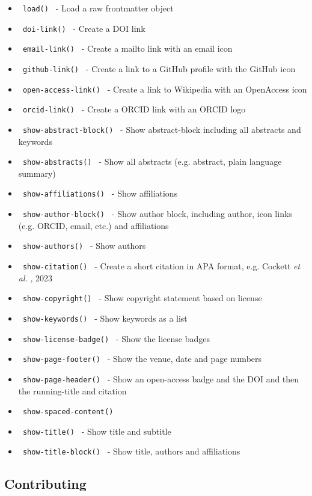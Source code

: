 \begin{itemize}
\tightlist
\item
  \texttt{\ load()\ } - Load a raw frontmatter object
\item
  \texttt{\ doi-link()\ } - Create a DOI link
\item
  \texttt{\ email-link()\ } - Create a mailto link with an email icon
\item
  \texttt{\ github-link()\ } - Create a link to a GitHub profile with
  the GitHub icon
\item
  \texttt{\ open-access-link()\ } - Create a link to Wikipedia with an
  OpenAccess icon
\item
  \texttt{\ orcid-link()\ } - Create a ORCID link with an ORCID logo
\item
  \texttt{\ show-abstract-block()\ } - Show abstract-block including all
  abstracts and keywords
\item
  \texttt{\ show-abstracts()\ } - Show all abstracts (e.g. abstract,
  plain language summary)
\item
  \texttt{\ show-affiliations()\ } - Show affiliations
\item
  \texttt{\ show-author-block()\ } - Show author block, including
  author, icon links (e.g. ORCID, email, etc.) and affiliations
\item
  \texttt{\ show-authors()\ } - Show authors
\item
  \texttt{\ show-citation()\ } - Create a short citation in APA format,
  e.g. Cockett \emph{et al.} , 2023
\item
  \texttt{\ show-copyright()\ } - Show copyright statement based on
  license
\item
  \texttt{\ show-keywords()\ } - Show keywords as a list
\item
  \texttt{\ show-license-badge()\ } - Show the license badges
\item
  \texttt{\ show-page-footer()\ } - Show the venue, date and page
  numbers
\item
  \texttt{\ show-page-header()\ } - Show an open-access badge and the
  DOI and then the running-title and citation
\item
  \texttt{\ show-spaced-content()\ }
\item
  \texttt{\ show-title()\ } - Show title and subtitle
\item
  \texttt{\ show-title-block()\ } - Show title, authors and affiliations
\end{itemize}

\subsection{Contributing}\label{contributing}


